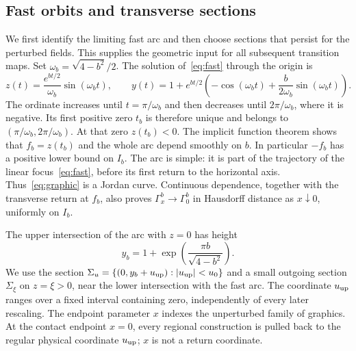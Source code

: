 \subsection{Fast orbits and transverse sections}
We first identify the limiting fast arc and then choose sections that
persist for the perturbed fields. This supplies the geometric input for
all subsequent transition maps.
Set $\omega_b=\sqrt{4-b^2}/2$. The solution of~\eqref{eq:fast}
through the origin is
\begin{equation}\label{eq:fast-orbit}
 z(t)=\frac{e^{bt/2}}{\omega_b}\sin(\omega_bt),\qquad
 y(t)=1+e^{bt/2}\left(-\cos(\omega_bt)
                  +\frac{b}{2\omega_b}\sin(\omega_bt)\right).
\end{equation}
The ordinate increases until $t=\pi/\omega_b$ and then decreases
until $2\pi/\omega_b$, where it is negative. Its first positive
zero $t_b$ is therefore unique and belongs to
$(\pi/\omega_b,2\pi/\omega_b)$. At that zero $z(t_b)<0$.
The implicit function theorem shows that $f_b=z(t_b)$ and the whole
arc depend smoothly on $b$. In particular $-f_b$ has a positive
lower bound on $I_b$. The arc is simple: it is part of the trajectory
of the linear focus~\eqref{eq:fast}, before its first return to the
horizontal axis. Thus~\eqref{eq:graphic} is a Jordan curve.
Continuous dependence, together with the transverse return at $f_b$,
also proves $\Gamma_x^b\to\Gamma_0^b$ in Hausdorff distance as
$x\downarrow0$, uniformly on $I_b$.

The upper intersection of the arc with $z=0$ has height
\[
 y_b=1+\exp\left(\frac{\pi b}{\sqrt{4-b^2}}\right).
\]
We use the section
$\Sigma_u=\{(0,y_b+u_{\rm up}):|u_{\rm up}|<u_0\}$ and a
small outgoing section $\Sigma_\xi$ on $z=\xi>0$, near the lower
intersection with the fast arc. The coordinate $u_{\rm up}$ ranges over a
fixed interval containing zero, independently of every later rescaling.
The endpoint parameter $x$ indexes the unperturbed family of graphics.
At the contact endpoint $x=0$, every regional construction is pulled back
to the regular physical coordinate $u_{\rm up}$; $x$ is not a return
coordinate.

